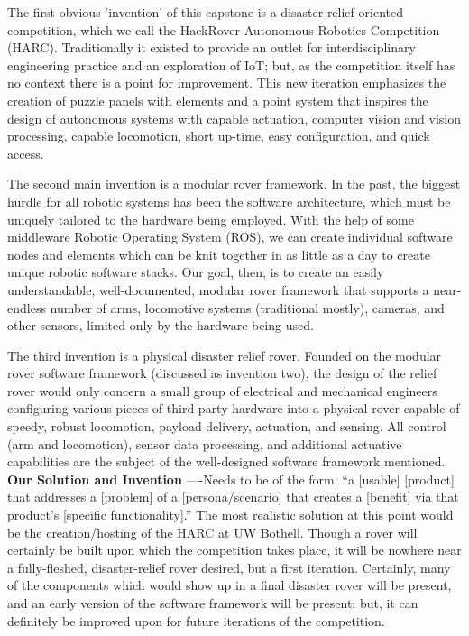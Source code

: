 \documentclass[a4paper, 10pt]{article}
\begin{document}
	The first obvious 'invention' of this capstone is a disaster relief-oriented competition, which we call the HackRover Autonomous Robotics Competition (HARC). Traditionally it existed to provide an outlet for interdisciplinary engineering practice and an exploration of IoT; but, as the competition itself has no context there is a point for improvement. This new iteration emphasizes the creation of puzzle panels with elements and a point system that inspires the design of autonomous systems with capable actuation, computer vision and vision processing, capable locomotion, short up-time, easy configuration, and quick access.

The second main invention is a modular rover framework. In the past, the biggest hurdle for all robotic systems has been the software architecture, which must be uniquely tailored to the hardware being employed. With the help of some middleware Robotic Operating System (ROS), we can create individual software nodes and elements which can be knit together in as little as a day to create unique robotic software stacks. Our goal, then, is to create an easily understandable, well-documented, modular rover framework that supports a near-endless number of arms, locomotive systems (traditional mostly), cameras, and other sensors, limited only by the hardware being used.	

The third invention is a physical disaster relief rover. Founded on the modular rover software framework (discussed as invention two), the design of the relief rover would only concern a small group of electrical and mechanical engineers configuring various pieces of third-party hardware into a physical rover capable of speedy, robust locomotion, payload delivery, actuation, and sensing. All control (arm and locomotion), sensor data processing, and additional actuative capabilities are the subject of the well-designed software framework mentioned. \\

		\textbf{Our Solution and Invention}
		----Needs to be of the form: “a [usable] [product] that addresses a [problem] of a [persona/scenario] that creates a [benefit] via that product’s [specific functionality].”
		The most realistic solution at this point would be the creation/hosting of the HARC at UW Bothell. Though a rover will certainly be built upon which the competition takes place, it will be nowhere near a fully-fleshed, disaster-relief rover desired, but a first iteration. Certainly, many of the components which would show up in a final disaster rover will be present, and an early version of the software framework will be present; but, it can definitely be improved upon for future iterations of the competition.
	
\end{document}
